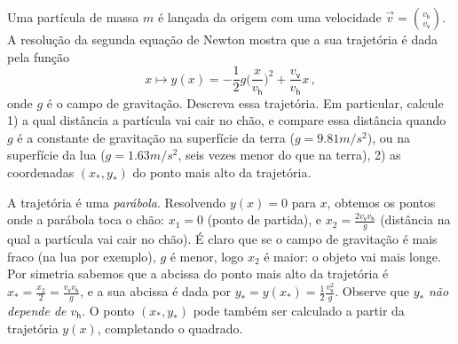 \begin{exo}\label{Exo:TrajetPartic}
Uma partícula de massa $m$ 
é lançada da origem com uma velocidade $\vec{v}=\binom{v_{\textsf{h}}}{v_{\textsf{v}}}$. 
A resolução da segunda equação de Newton mostra que a sua trajetória é dada pela função 
$$x\mapsto y(x)=-\frac12 g\Big(
\frac{x}{v_{\textsf{h}}}\Big)^2+\frac{v_\textsf{v}}{v_{\textsf{h}}}x\,,$$
onde $g$ é o campo de gravitação.
Descreva essa trajetória. Em particular, calcule 
 1) a qual distância a partícula vai cair no chão, e compare essa distância quando $g$ é a
constante de gravitação na superfície da terra ($g=9.81m/s^2$), ou na superfície da lua
($g=1.63m/s^2$, seis vezes menor do que na terra), 2) as coordenadas $(x_*,y_*)$ do ponto
mais alto da trajetória.
\begin{sol}
A trajetória é uma \emph{parábola}.
Resolvendo $y(x)=0$ para $x$, obtemos os pontos onde a parábola toca o chão: $x_1=0$
(ponto de partida), e 
$x_2=\frac{2v_{\textsf{v}}v_{\textsf{h}}}{g}$ (distância na qual a partícula vai cair no
chão).
É claro que se o campo de gravitação é mais fraco (na lua por exemplo), $g$ é menor, logo
$x_2$ é maior: o objeto vai mais longe.
Por simetria sabemos que a abcissa do ponto mais alto da trajetória é 
$x_*=\frac{x_2}{2}=\frac{v_{\textsf{v}}v_{\textsf{h}}}{g}$, e a sua abcissa é dada por
$y_*=y(x_*)=\tfrac12 \frac{v_{\textsf{v}}^2}{g}$. Observe que $y_*$ \emph{não depende de
$v_{\textsf{h}}$}.
O ponto $(x_*,y_*)$ pode também ser calculado a partir da trajetória $y(x)$, completando
o quadrado.
\end{sol}
\end{exo}

